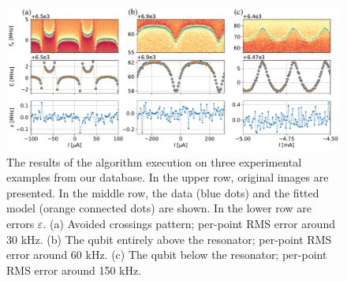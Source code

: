 \documentclass[%
 aip,
 amsmath,amssymb,
 reprint,%
]{revtex4-1}
\begin{document}
\begin{figure}
	\centering
	\includegraphics[width=\linewidth]{fit_cases}
	\caption{The results of the algorithm execution on three experimental examples from our database. In the upper row, original images are presented. In the middle row, the data  (blue dots) and the fitted model (orange connected dots) are shown. In the lower row are errors $\varepsilon$. (a) Avoided crossings pattern; per-point RMS error around 30 kHz. (b) The qubit entirely above the resonator; per-point RMS error around 60 kHz. (c) The qubit below the resonator; per-point RMS error around 150 kHz.}
	\label{fig:anti_fit_cases}
\end{figure}
\end{document}
